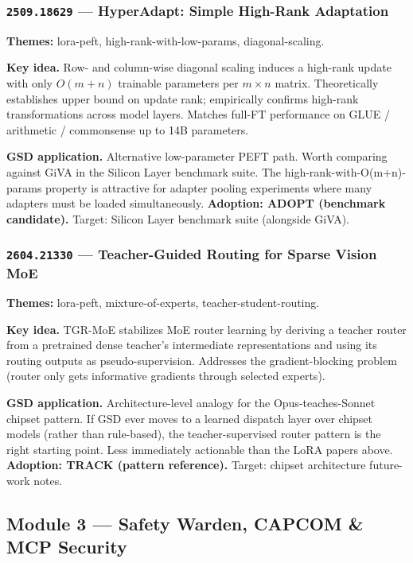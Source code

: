 \documentclass[11pt,letterpaper]{article}
\newcommand{\arxivid}[1]{\texttt{\textcolor{accent}{#1}}}
\newcommand{\paperhead}[2]{\noindent\textbf{\sffamily\textcolor{secondary}{#1}} \textemdash{} #2}
\begin{document}
\subsubsection{\arxivid{2509.18629} --- HyperAdapt: Simple High-Rank Adaptation}

\paperhead{Themes:}{lora-peft, high-rank-with-low-params, diagonal-scaling.}

\textbf{Key idea.} Row- and column-wise diagonal scaling induces a high-rank update with only $O(m+n)$ trainable parameters per $m\times n$ matrix. Theoretically establishes upper bound on update rank; empirically confirms high-rank transformations across model layers. Matches full-FT performance on GLUE / arithmetic / commonsense up to 14B parameters.

\textbf{GSD application.} Alternative low-parameter PEFT path. Worth comparing against GiVA in the Silicon Layer benchmark suite. The high-rank-with-O(m+n)-params property is attractive for adapter pooling experiments where many adapters must be loaded simultaneously. \textbf{Adoption: ADOPT (benchmark candidate).} Target: Silicon Layer benchmark suite (alongside GiVA).

\subsubsection{\arxivid{2604.21330} --- Teacher-Guided Routing for Sparse Vision MoE}

\paperhead{Themes:}{lora-peft, mixture-of-experts, teacher-student-routing.}

\textbf{Key idea.} TGR-MoE stabilizes MoE router learning by deriving a teacher router from a pretrained dense teacher's intermediate representations and using its routing outputs as pseudo-supervision. Addresses the gradient-blocking problem (router only gets informative gradients through selected experts).

\textbf{GSD application.} Architecture-level analogy for the Opus-teaches-Sonnet chipset pattern. If GSD ever moves to a learned dispatch layer over chipset models (rather than rule-based), the teacher-supervised router pattern is the right starting point. Less immediately actionable than the LoRA papers above. \textbf{Adoption: TRACK (pattern reference).} Target: chipset architecture future-work notes.

\subsection{Module 3 --- Safety Warden, CAPCOM \& MCP Security}
\end{document}
